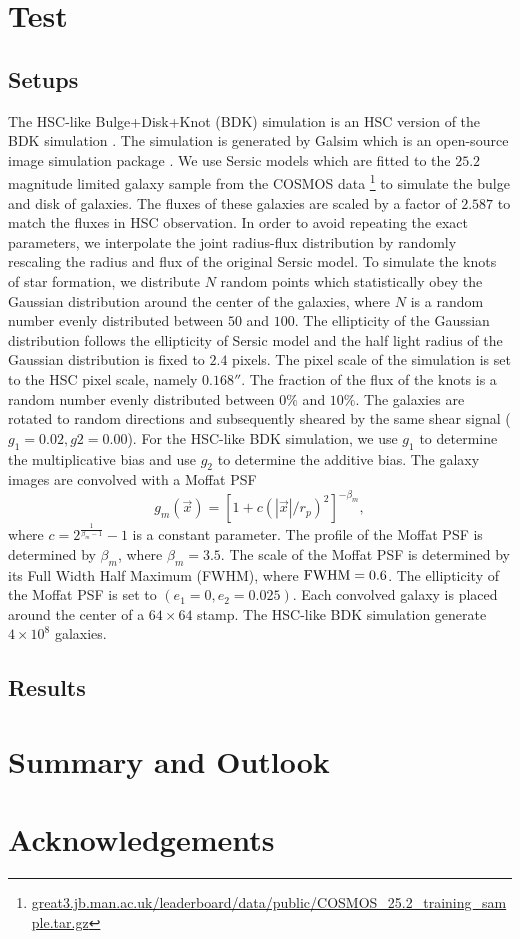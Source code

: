 \documentclass[a4paper,fleqn,usenatbib]{mnras}
\begin{document}
\section{Test}
\label{sec:Test}

\subsection{Setups}
\label{sec:Test-setup}

The HSC-like Bulge+Disk+Knot (BDK) simulation is an HSC version of the BDK
simulation \citep{metacal2}. The simulation is generated by Galsim which is an
open-source image simulation package \citep{GalSim}. We use Sersic models
\citep{Sersic1963} which are fitted to the $25.2$ magnitude limited galaxy
sample from the COSMOS data
\footnote{\url{great3.jb.man.ac.uk/leaderboard/data/public/COSMOS_25.2_training_sample.tar.gz}}
to simulate the bulge and disk of galaxies. The fluxes of these galaxies are
scaled by a factor of $2.587$ to match the fluxes in HSC observation. In order
to avoid repeating the exact parameters, we interpolate the joint radius-flux
distribution by randomly rescaling the radius and flux of the original Sersic
model. To simulate the knots of star formation, we distribute $N$ random points
which statistically obey the Gaussian distribution around the center of the
galaxies, where $N$ is a random number evenly distributed between $50$ and
$100$. The ellipticity of the Gaussian distribution follows the ellipticity of
Sersic model and the half light radius of the Gaussian distribution is fixed to
$2.4$ pixels. The pixel scale of the simulation is set to the HSC pixel scale,
namely $0.168''$. The fraction of the flux of the knots is a random number
evenly distributed between $0\%$ and $10\%$. The galaxies are rotated to random
directions and subsequently sheared by the same shear signal
($g_1=0.02,g2=0.00$). For the HSC-like BDK simulation, we use $g_1$ to
determine the multiplicative bias and use $g_2$ to determine the additive bias.
The galaxy images are convolved with a Moffat PSF \citep{Moffat1969}
\begin{equation}\label{Moffat PSF}
g_{m}(\vec{x})=[1+c(|\vec{x}|/r_p)^2]^{-\beta_m},  \end{equation} where
$c=2^{\frac{1}{\beta_m-1}}-1$ is a constant parameter. The profile of the
Moffat PSF is determined by $\beta_m$, where $\beta_{m}=3.5$. The scale of the
Moffat PSF is determined by its Full Width Half Maximum (FWHM), where
$\rm{FWHM}=0.6$.  The ellipticity of the Moffat PSF is set to
$(e_1=0,e_2=0.025)$. Each convolved galaxy is placed around the center of a
$64\times 64$ stamp. The HSC-like BDK simulation generate $4\times 10^8$
galaxies.


\subsection{Results}
\label{sec:Test-res}

\section{Summary and Outlook}
\label{sec:Summary}


\section*{Acknowledgements}



\appendix

\bsp	%
\label{lastpage}
\end{document}
